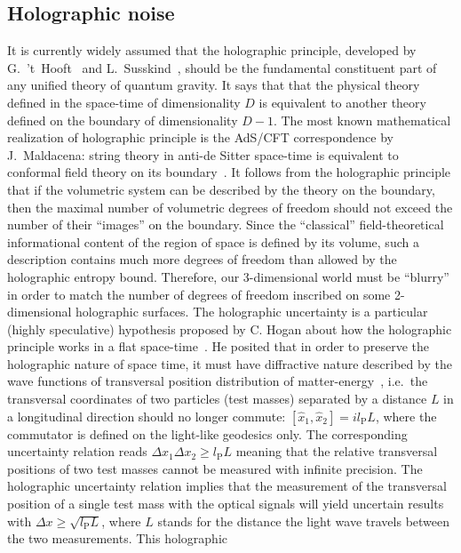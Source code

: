 \subsection{Holographic noise}\label{app:holo}
It is
currently widely assumed that the holographic principle, developed
by G.~'t~Hooft~\cite{Hooft1993} and L.~Susskind~\cite{Susskind1995}, should be the fundamental
constituent part of any unified theory of quantum gravity.
It says
that that the physical theory defined in the space-time of
dimensionality $D$ is equivalent to another theory defined on the
boundary of dimensionality $D-1$. The most known mathematical
realization of holographic principle is the AdS/CFT correspondence
by J.~Maldacena: string theory in anti-de Sitter space-time is
equivalent to conformal field theory on its boundary~\cite{Maldacena1997}.
It follows
from the holographic principle that if the volumetric system can
be described by the theory on the boundary, then the maximal
number of volumetric degrees of freedom should not exceed the
number of their ``images'' on the boundary. Since the
``classical'' field-theoretical informational content of the
region of space is defined by its volume, such a description
contains much more degrees of freedom than allowed by the
holographic entropy bound. Therefore, our 3-dimensional world must
be ``blurry'' in order to match the number of degrees of freedom
inscribed on some 2-dimensional holographic surfaces. The
holographic uncertainty is a particular (highly speculative)
hypothesis proposed by C. Hogan about how the holographic
principle works in a flat space-time~\cite{2009_holonoise}. He
posited that in order to preserve the holographic nature of space
time, it must have diffractive nature described by the wave
functions of transversal position distribution of matter-energy~\cite{2009_m-theory}, i.e.\ the transversal coordinates of two
particles (test masses) separated by a distance $L$ in a
longitudinal direction should no longer commute:
$[\hat{x}_1,\hat{x}_2]=il_\textrm{P}L$, where the commutator is
defined on the light-like geodesics only. The corresponding
uncertainty relation reads $\Delta x_1\Delta x_2\geq
l_\textrm{P}L$ meaning that the relative transversal positions of
two test masses cannot be measured with infinite precision. The
holographic uncertainty relation implies that the measurement of
the transversal position of a single test mass with the optical
signals will yield uncertain results with $\Delta
x\geq\sqrt{l_\textrm{P}L}$, where $L$ stands for the distance the
light wave travels between the two measurements. This holographic
